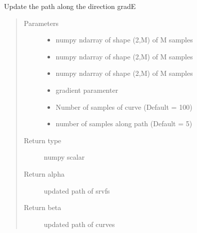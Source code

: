 \documentclass[letterpaper,10pt,english]{sphinxmanual}
\begin{document}

\begin{fulllineitems}
\label{\detokenize{geodesic:geodesic.update_path}}
Update the path along the direction \sphinxhyphen{}gradE
\begin{quote}\begin{description}
\item[{Parameters}] \leavevmode\begin{itemize}
\item {} 
 \textendash{} numpy ndarray of shape (2,M) of M samples

\item {} 
 \textendash{} numpy ndarray of shape (2,M) of M samples

\item {} 
 \textendash{} numpy ndarray of shape (2,M) of M samples

\item {} 
 \textendash{} gradient paramenter

\item {} 
 \textendash{} Number of samples of curve (Default = 100)

\item {} 
 \textendash{} number of samples along path (Default = 5)

\end{itemize}

\item[{Return type}] \leavevmode
numpy scalar

\item[{Return alpha}] \leavevmode
updated path of srvfs

\item[{Return beta}] \leavevmode
updated path of curves

\end{description}\end{quote}

\end{fulllineitems}
\end{document}
